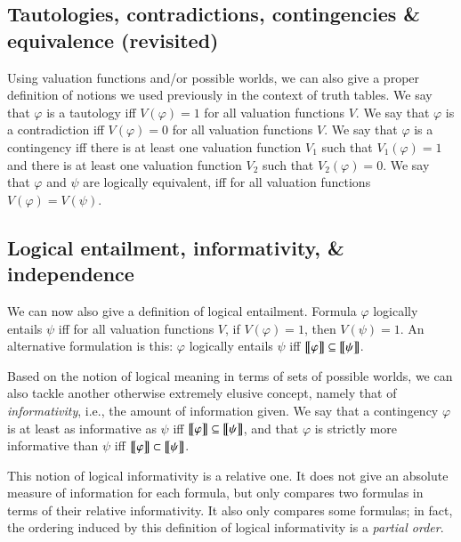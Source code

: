 \documentclass[nobib,nofonts]{tufte-handout}
\begin{document}
\subsection{Tautologies, contradictions, contingencies \& equivalence (revisited)}

Using valuation functions and/or possible worlds, we can also give a proper definition of notions we used previously in the context of truth tables.
We say that $\varphi$ is a tautology iff $V(\varphi) = 1$ for all valuation functions $V$.
We say that $\varphi$ is a contradiction iff $V(\varphi) = 0$ for all valuation functions $V$.
We say that $\varphi$ is a contingency iff there is at least one valuation function $V_{1}$ such that $V_{1}(\varphi) = 1$ and there is at least one valuation function $V_{2}$ such that $V_{2}(\varphi) = 0$.
We say that $\varphi$ and \(\psi\) are logically equivalent, iff for all valuation functions $V(\varphi) = V(\psi)$.


\subsection{Logical entailment, informativity, \& independence}

We can now also give a definition of logical entailment.
Formula $\varphi$ logically entails $\psi$ iff for all valuation functions $V$, if $V(\varphi)=1$, then $V(\psi)=1$.
An alternative formulation is this: $\varphi$ logically entails $\psi$ iff $\left [\! \left [ \varphi \right ]\! \right] \subseteq \left [\! \left [ \psi \right ]\! \right]$.

Based on the notion of logical meaning in terms of sets of possible worlds, we can also tackle another otherwise extremely elusive concept, namely that of \emph{informativity}, i.e., the amount of information given.
We say that a contingency $\varphi$ is at least as informative as $\psi$ iff $\left [\! \left [ \varphi \right ]\! \right] \subseteq \left [\! \left [ \psi \right ]\! \right]$, and that $\varphi$ is strictly more informative than $\psi$ iff $\left [\! \left [ \varphi \right ]\! \right] \subset \left [\! \left [ \psi \right ]\! \right]$.

This notion of logical informativity is a relative one.
It does not give an absolute measure of information for each formula, but only compares two formulas in terms of their relative informativity.
It also only compares some formulas; in fact, the ordering induced by this definition of logical informativity is a \emph{partial order}.
\end{document}
